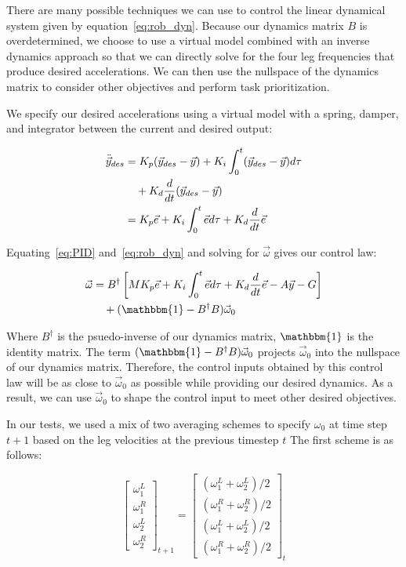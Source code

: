 There are many possible techniques we can use to control the linear dynamical system given by equation~\ref{eq:rob_dyn}. Because our dynamics matrix $B$ is overdetermined, we choose to use a virtual model combined with an inverse dynamics approach so that we can directly solve for the four leg frequencies that produce desired accelerations. We can then use the nullspace of the dynamics matrix to consider other objectives and perform task prioritization.

We specify our desired accelerations using a virtual model with a spring, damper, and integrator between the current and desired output:

\begin{align}
    \ddot{\vec{y}}_{des} &= K_p (\vec{y}_{des} - \vec{y}) + K_i \int_0^t (\vec{y}_{des} - \vec{y}) d\tau \notag \\
                         &\quad + K_d \frac{d}{dt} (\vec{y}_{des} - \vec{y}) \\
                         &= K_p \vec{e} + K_i \int_0^t \vec{e} d \tau + K_d \frac{d}{dt} \vec{e} \label{eq:PID}
\end{align}

Equating~\ref{eq:PID} and~\ref{eq:rob_dyn} and solving for $\vec{\omega}$ gives our control law:

\begin{align}
    \vec{\omega} &= B^{\dagger} \left[ M K_p \vec{e} + K_i \int_0^t \vec{e} d \tau + K_d \frac{d}{dt} \vec{e} - A \vec{y} - G \right] \notag \\
                 &\quad + (\mathbbm{1} - B^{\dagger} B) \vec{\omega}_0 \label{eq:control}
\end{align}

\noindent Where $B^{\dagger}$ is the psuedo-inverse of our dynamics matrix, $\mathbbm{1}$ is the identity matrix. The term $(\mathbbm{1} - B^{\dagger} B) \vec{\omega}_0$ projects $\vec{\omega}_0$ into the nullspace of our dynamics matrix. Therefore, the control inputs obtained by this control law will be as close to $\vec{\omega}_0$ as possible while providing our desired dynamics. As a result, we can use $\vec{\omega}_0$ to shape the control input to meet other desired objectives.

In our tests, we used a mix of two averaging schemes to specify $\omega_0$ at time step $t+1$ based on the leg velocities at the previous timestep $t$ The first scheme is as follows:

\begin{equation}
    \begin{bmatrix} \omega_1^L \\ \omega_1^R \\ \omega_2^L \\ \omega_2^R \end{bmatrix}_{t+1} = \begin{bmatrix} (\omega_1^L + \omega_2^L)/2 \\(\omega_1^R + \omega_2^R)/2 \\ (\omega_1^L + \omega_2^L)/2 \\ (\omega_1^R + \omega_2^R)/2 \end{bmatrix}_{t}
\end{equation}

